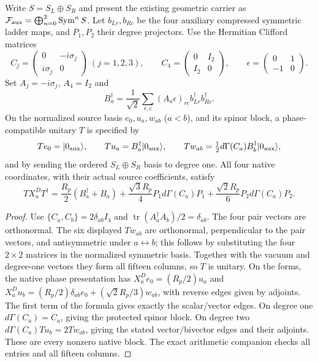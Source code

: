 \documentclass[11pt,a4paper]{article}
\begin{document}
\begin{proposition}
\label{p2b:prop:v2174-geometric-pair-presentation}
Write $S=S_L\oplus S_R$ and present the existing geometric carrier as
$\mathcal F_{\rm aux}=\bigoplus_{n=0}^2\operatorname{Sym}^nS$.
Let $b_{Lr},b_{Rc}$ be the four auxiliary compressed symmetric ladder maps,
and $P_1,P_2$ their degree projectors. Use the Hermitian Clifford matrices
\[
 C_j=\begin{pmatrix}0&-i\sigma_j\\i\sigma_j&0\end{pmatrix}
 \ (j=1,2,3),\qquad
 C_4=\begin{pmatrix}0&I_2\\I_2&0\end{pmatrix},\qquad
 \epsilon=\begin{pmatrix}0&1\\-1&0\end{pmatrix}.
\]
Set $A_j=-i\sigma_j$, $A_4=I_2$ and
\[
 B_a^\dagger=\frac1{\sqrt2}\sum_{r,c}(A_a\epsilon)_{rc}
                         b_{Lr}^\dagger b_{Rc}^\dagger.
\]
On the normalized source basis $e_0,u_a,w_{ab}$ ($a<b$), and its spinor
block, a phase-compatible unitary $T$ is specified by
\[
 Te_0=|0_{\rm aux}\rangle,\qquad
 Tu_a=B_a^\dagger|0_{\rm aux}\rangle,\qquad
 Tw_{ab}=\tfrac12d\Gamma(C_a)B_b^\dagger|0_{\rm aux}\rangle,
\]
and by sending the ordered $S_L\oplus S_R$ basis to degree one. All four
native coordinates, with their actual source coefficients, satisfy
\begin{equation}
 TX_a^DT^\dagger=\frac{R_p}{2}(B_a^\dagger+B_a)
       +\frac{\sqrt3R_p}{4}P_1d\Gamma(C_a)P_1
       +\frac{\sqrt2R_p}{6}P_2d\Gamma(C_a)P_2.
 \label{p2b:eq:v2174-geometric-pair-presentation}
\end{equation}
\end{proposition}
\begin{proof}
Use $\{C_a,C_b\}=2\delta_{ab}I_4$ and
$\operatorname{tr}(A_a^\dagger A_b)/2=\delta_{ab}$.
The four pair vectors are orthonormal. The six displayed $Tw_{ab}$ are
orthonormal, perpendicular to the pair vectors, and antisymmetric under
$a\leftrightarrow b$; this follows by substituting the four $2\times2$
matrices in the normalized symmetric basis. Together with the vacuum and
degree-one vectors they form all fifteen columns, so $T$ is unitary.
On the forms, the native phase presentation has
$X_a^De_0=(R_p/2)u_a$ and
$X_a^Du_b=(R_p/2)\delta_{ab}e_0+(\sqrt2R_p/3)w_{ab}$,
with reverse edges given by adjoints. The first term of the formula gives
exactly the scalar/vector edges. On degree one $d\Gamma(C_a)=C_a$,
giving the protected spinor block. On degree two
$d\Gamma(C_a)Tu_b=2Tw_{ab}$, giving the stated vector/bivector edges and
their adjoints. These are every nonzero native block. The exact arithmetic
companion checks all entries and all fifteen columns.
\end{proof}
\end{document}
